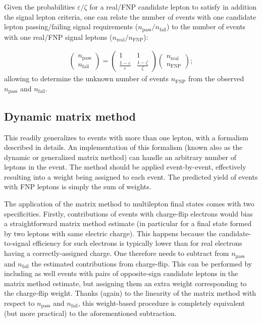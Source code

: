 Given the probabilities $\varepsilon/\zeta$ for a real/FNP candidate lepton to satisfy in addition the signal lepton criteria, 
one can relate the number of events with one candidate lepton passing/failing signal requirements ($n_\text{pass}/n_\text{fail}$) to the number of events with one real/FNP signal leptons ($n_\text{real}/n_\text{FNP}$):

\begin{align}
\begin{pmatrix}n_\text{pass}\\n_\text{fail}\end{pmatrix} 
= \begin{pmatrix}1 & 1\\ \frac{1-\varepsilon}\varepsilon & \frac{1-\zeta}\zeta\end{pmatrix}
\begin{pmatrix}n_\text{real}\\n_\text{FNP}\end{pmatrix}; 
\label{eqn:matrix_method}
\end{align}
allowing to determine the unknown number of events $n_\text{FNP}$ from the observed $n_\text{pass}$ and $n_\text{fail}$. 

\subsection{Dynamic matrix method}


This readily generalizes to events with more than one lepton, with a formalism described in details.
An implementation of this formalism (known also as the dynamic or generalized matrix method) can handle an arbitrary number of leptons 
in the event. 
The method should be applied event-by-event, effectively resulting into a weight being assigned to each event. The predicted yield of 
events with FNP leptons is simply the sum of weights.


The application of the matrix method to multilepton final states comes with two specificities. Firstly, contributions of events with charge-flip electrons would bias a straightforward matrix method estimate (in particular for a final state formed by two leptons with same electric charge). This happens because the candidate-to-signal efficiency for such electrons is typically lower than for real electrons having a correctly-assigned charge. One therefore needs to subtract from $n_\text{pass}$ and $n_\text{fail}$ the estimated contributions from charge-flip. This can be performed by including as well events with pairs of opposite-sign candidate leptons in the matrix method estimate, but assigning them an extra weight corresponding to the charge-flip weight. Thanks (again) to the linearity of the matrix method with respect to $n_\text{pass}$ and $n_\text{fail}$, this weight-based procedure is completely equivalent (but more practical) to the aforementioned subtraction. 

